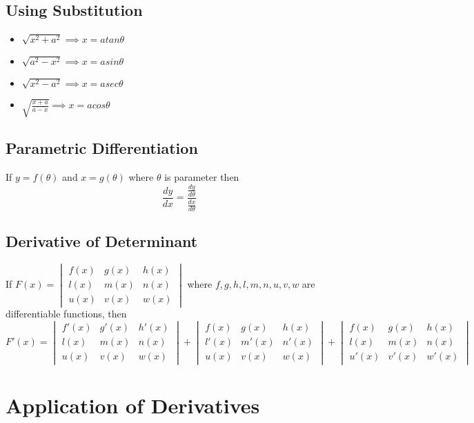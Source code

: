 \documentclass[12pt]{article}
\begin{document}
\subsection{Using Substitution}
\begin{itemize}
\item  $\sqrt{x^2+a^2} \implies x=atan \theta$
\item  $\sqrt{a^2-x^2} \implies x=asin \theta$
\item  $\sqrt{x^2-a^2} \implies x=asec \theta$
\item  $\sqrt{\frac{x+a}{a-x}} \implies x=acos \theta$
\end{itemize}
\subsection{Parametric Differentiation}
If $y=f(\theta)$ and $x=g(\theta)$ where $\theta$ is parameter then
$$\frac{dy}{dx} = \frac{\frac{dy}{d\theta}}{\frac{dx}{d\theta}}$$
\subsection{Derivative of Determinant}
If $F(x)= 
\begin{vmatrix}
f(x) & g(x) & h(x)\\
l(x) & m(x) & n(x)\\
u(x) & v(x) & w(x)
\end{vmatrix}$
where $f,g,h,l,m,n,u,v,w$ are differentiable functions, then
$F'(x)= \begin{vmatrix}
f'(x) & g'(x) & h'(x)\\
l(x) & m(x) & n(x)\\
u(x) & v(x) & w(x)
\end{vmatrix} +
\begin{vmatrix}
f(x) & g(x) & h(x)\\
l'(x) & m'(x) & n'(x)\\
u(x) & v(x) & w(x)
\end{vmatrix} +
\begin{vmatrix}
f(x) & g(x) & h(x)\\
l(x) & m(x) & n(x)\\
u'(x) & v'(x) & w'(x)
\end{vmatrix}
$
\section{Application of Derivatives}
\end{document}
